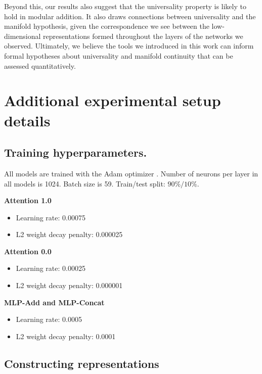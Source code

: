 \documentclass{article} %
\theoremstyle{plain}
\theoremstyle{definition}
\newtheorem{empirical fact}[theorem]{Empirical Fact}
\begin{document}
Beyond this, our results also suggest that the universality property is likely to hold in modular addition.
It also draws connections between universality and the manifold hypothesis, given the correspondence we see between the low-dimensional representations formed throughout the layers of the networks we observed.
Ultimately, we believe the tools we introduced in this work can inform formal hypotheses about universality and manifold continuity that can be assessed quantitatively.







\appendix

\section{Additional experimental setup details}\label{app:additional-exp-details}

\subsection{Training hyperparameters.}

All models are trained with the Adam optimizer \cite{kingma2014adam}. Number of neurons per layer in all models is 1024. Batch size is 59. Train/test split: $90\%/10\%$.

\textbf{Attention 1.0}
\begin{itemize}
    \item Learning rate: 0.00075
    \item L2 weight decay penalty: 0.000025
\end{itemize}

\textbf{Attention 0.0}
\begin{itemize}
    \item Learning rate: 0.00025
    \item L2 weight decay penalty: 0.000001
\end{itemize}

\textbf{MLP-Add and MLP-Concat}
\begin{itemize}
    \item Learning rate: 0.0005
    \item L2 weight decay penalty: 0.0001
\end{itemize}

\subsection{Constructing representations}
\end{document}
